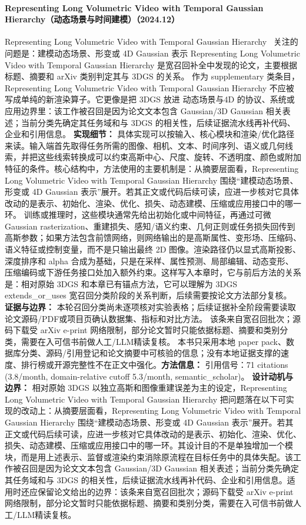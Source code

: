 \paragraph{Representing Long Volumetric Video with Temporal Gaussian Hierarchy（动态场景与时间建模）（2024.12）}
Representing Long Volumetric Video with Temporal Gaussian Hierarchy~\cite{2412_09608} 关注的问题是：建模动态场景、形变或 4D Gaussian 表示 Representing Long Volumetric Video with Temporal Gaussian Hierarchy 是宽召回补全中发现的论文，主要根据标题、摘要和 arXiv 类别判定其与 3DGS 的关系。
作为 supplementary 类条目，Representing Long Volumetric Video with Temporal Gaussian Hierarchy 不应被写成单纯的新渲染算子。它更像是把 3DGS 放进 动态场景与4D 的协议、系统或应用边界里：该工作被召回是因为论文文本包含 Gaussian/3D Gaussian 相关表述；当前分类先确定其任务域和与 3DGS 的相关性，后续证据流水线再补代码、企业和引用信息。
\textbf{实现细节：} 具体实现可以按输入、核心模块和渲染/优化路径来读。输入端首先取得任务所需的图像、相机、文本、时间序列、语义或几何线索，并把这些线索转换成可以约束高斯中心、尺度、旋转、不透明度、颜色或附加特征的条件。核心结构中，方法使用的主要机制是：从摘要层面看，Representing Long Volumetric Video with Temporal Gaussian Hierarchy 围绕“建模动态场景、形变或 4D Gaussian 表示”展开。若其正文或代码后续可读，应进一步核对它具体改动的是表示、初始化、渲染、优化、损失、动态建模、压缩或应用接口中的哪一环。 训练或推理时，这些模块通常先给出初始化或中间特征，再通过可微 Gaussian rasterization、重建损失、感知/语义约束、几何正则或任务损失回传到高斯参数；如果方法包含前馈网络，则网络输出的是高斯属性、变形场、压缩码、语义特征或控制变量，而不是只输出最终 2D 图像。渲染路径仍以显式高斯投影、深度排序和 alpha 合成为基础，只是在采样、属性预测、局部编辑、动态变形、压缩编码或下游任务接口处加入额外约束。这样写入本章时，它与前后方法的关系是：相对原始 3DGS 和本章已有锚点方法，它可以理解为 3DGS extends\_or\_uses 宽召回分类阶段的关系判断，后续需要按论文方法部分复核。
\textbf{证据与边界：} 本轮召回分类尚未逐项核对实验表格；后续证据补全阶段需要读取论文源码/PDF或项目页确认数据集、指标和对比方法。 该条来自宽召回批次；源码下载受 arXiv e-print 网络限制，部分论文暂时只能依据标题、摘要和类别分类，需要在入可信书前做人工/LLM精读复核。 本书只采用本地 paper pack、数据库分类、源码/引用登记和论文摘要中可核验的信息；没有本地证据支撑的速度、排行榜或开源完整性不在正文中强化。\textbf{方法信息：} 引用信号：71 citations (3.8/month, domain-relative cutoff 5.3/month, semantic\_scholar)。
\textbf{设计动机与边界：} 相对原始 3DGS 以独立高斯和图像重建误差为主的设定，Representing Long Volumetric Video with Temporal Gaussian Hierarchy 把问题落在以下可实现的改动上：从摘要层面看，Representing Long Volumetric Video with Temporal Gaussian Hierarchy 围绕“建模动态场景、形变或 4D Gaussian 表示”展开。若其正文或代码后续可读，应进一步核对它具体改动的是表示、初始化、渲染、优化、损失、动态建模、压缩或应用接口中的哪一环。其设计目的不是单独增加一个模块，而是用上述表示、监督或渲染约束消除原流程在目标任务中的具体失配。该工作被召回是因为论文文本包含 Gaussian/3D Gaussian 相关表述；当前分类先确定其任务域和与 3DGS 的相关性，后续证据流水线再补代码、企业和引用信息。适用时还应保留论文给出的边界：该条来自宽召回批次；源码下载受 arXiv e-print 网络限制，部分论文暂时只能依据标题、摘要和类别分类，需要在入可信书前做人工/LLM精读复核。
